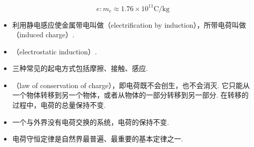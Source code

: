 \begin{itemize}
$$
e:m_e\approx1.76\times10^{11}\text{C}/\text{kg}
$$
\item 利用静电感应使金属带电叫做（electrification by induction），所带电荷叫做（induced charge）.
\item {}（electrostatic induction）.
\item 三种常见的起电方式包括摩擦、接触、感应.
\item {}（law of conservation of charge），即电荷既不会创生，也不会消灭. 它只能从一个物体转移到另一个物体，或者从物体的一部分转移到另一部分. 在转移的过程中，电荷的总量保持不变.
\item 一个与外界没有电荷交换的系统，电荷的保持不变.
\item 电荷守恒定律是自然界最普遍、最重要的基本定律之一.
\end{itemize}